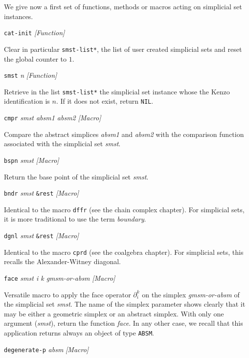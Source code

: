 We give now a first set of functions, methods or macros acting on  simplicial set instances. 
\vskip 0.45cm
{\parindent=0mm
{\leftskip=5mm
{\tt cat-init} \hfill {\em [Function]} \par}
{\leftskip=15mm
Clear in particular {\tt *smst-list*}, the list of user created simplicial sets  and reset
the global counter to $1$. \par}
{\leftskip=5mm 
{\tt smst} {\em n} \hfill {\em [Function]}\par}
{\leftskip=15mm 
Retrieve in the list {\tt *smst-list*} the simplicial set instance whose the Kenzo identification
is $n$. If it does not exist, return {\tt NIL}. \par}
{\leftskip=5mm 
{\tt cmpr} {\em smst  absm1 absm2} \hfill {\em [Macro]}\par}
{\leftskip=15mm 
Compare the abstract simplices {\em absm1} and {\em absm2} with the comparison function
associated with the simplicial set {\em smst}. \par}
{\leftskip=5mm 
{\tt bspn} {\em smst} \hfill {\em [Macro]}\par}
{\leftskip=15mm 
Return the base point of the simplicial set {\em smst}. \par}
{\leftskip=5mm 
{\tt bndr}  {\em smst} {\tt \&rest} \hfill {\em [Macro]}\par}
{\leftskip=15mm 
Identical to the macro {\tt dffr} (see the chain complex chapter). For simplicial sets, it is more traditional to
use the term {\em boundary}. \par}
{\leftskip=5mm 
{\tt dgnl} {\em smst} {\tt \&rest} \hfill {\em [Macro]}\par}
{\leftskip=15mm 
Identical to  the macro {\tt cprd} (see the coalgebra chapter). For simplicial sets, this recalls the 
Alexander-Witney diagonal. \par}
{\leftskip=5mm 
{\tt face} {\em smst i k  gmsm-or-absm} \hfill {\em [Macro]}\par}
{\leftskip=15mm 
Versatile macro to apply the face operator $\partial_i^k$ on the   simplex {\em gmsm-or-absm} of the simplicial set
{\em smst}. The name of the simplex parameter
shows clearly that it may be either a geometric simplex or an abstract simplex. 
With only one argument ({\em smst}), return the function {\em face}. 
In any other case, we recall that this application   returns always  an object of type {\tt ABSM}. \par}
{\leftskip=5mm 
{\tt degenerate-p} {\em  absm} \hfill {\em [Macro]} \par}
}
